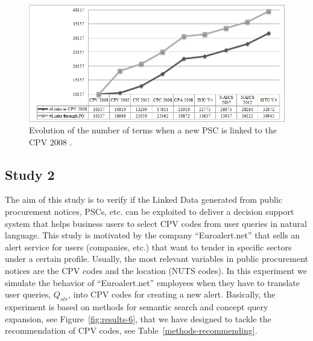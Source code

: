  \begin{figure}[!ht]
\centering
	\includegraphics[width=\textwidth]{./imgs/fig-5}
 \caption{Evolution of the number of terms when a new PSC is linked to the CPV 2008 .}
 \label{fig:results-3}
\end{figure}


\subsection{Study 2}
The aim of this study is to verify if the Linked Data generated from public procurement notices, PSCs, etc. can be exploited to deliver a decision 
support system that helps business users to select CPV codes from user queries in natural language. This study is motivated by the company ``Euroalert.net'' 
that sells an alert service for users (companies, etc.) that want to tender in specific sectors under a certain profile. 
Usually, the most relevant variables in public procurement notices are the CPV codes and the location (NUTS codes). In this experiment 
we simulate the behavior of ``Euroalert.net'' employees when they have to translate user queries, $Q_{str}$, into CPV codes for creating a new alert. 
Basically, the experiment is based on methods for semantic search and concept query expansion, see Figure~\ref{fig:results-6}, that we have designed to 
tackle the recommendation of CPV codes, see Table~\ref{methods-recommending}. 

